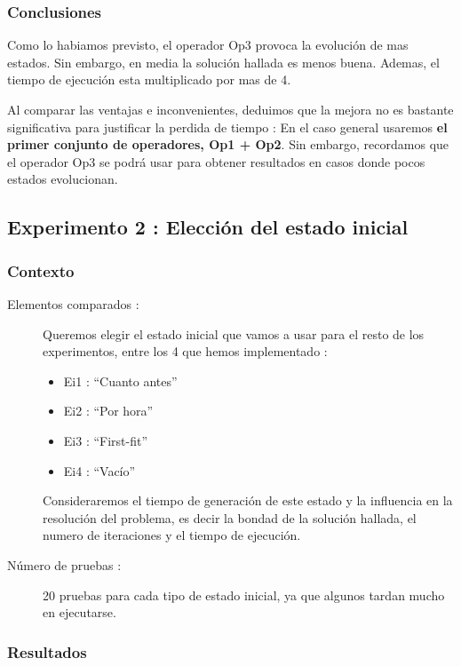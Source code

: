 \documentclass{article}
\begin{document}
\subsubsection{Conclusiones}

Como lo habiamos previsto, el operador Op3 provoca la evolución de mas estados.
Sin embargo, en media la solución hallada es menos buena. Ademas, el tiempo de
ejecución esta multiplicado por mas de 4.

Al comparar las ventajas e inconvenientes, deduimos que la mejora no es bastante
significativa para justificar la perdida de tiempo : En el caso general usaremos
\textbf{el primer conjunto de operadores, Op1 + Op2}. Sin embargo, recordamos
que el operador Op3 se podrá usar para obtener resultados en casos donde pocos
estados evolucionan.

\subsection{Experimento 2 : Elección del estado inicial}

\subsubsection{Contexto}

\begin{description}
\item[Elementos comparados :] Queremos elegir el estado inicial que vamos a usar
para el resto de los experimentos, entre los 4 que hemos implementado :
\begin{itemize}
\item Ei1 : ``Cuanto antes''
\item Ei2 : ``Por hora''
\item Ei3 : ``First-fit''
\item Ei4 : ``Vacío''
\end{itemize}

Consideraremos el tiempo de generación de este estado y la influencia en la
resolución del problema, es decir la bondad de la solución hallada, el numero de
iteraciones y el tiempo de ejecución.
\item[Número de pruebas :] 20 pruebas para cada tipo de estado inicial, ya que
algunos tardan mucho en ejecutarse.
\end{description}

\subsubsection{Resultados}
\end{document}
